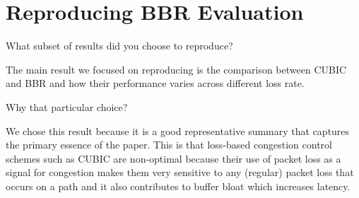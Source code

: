 
\section{Reproducing BBR Evaluation}

 What subset of results did you choose to reproduce?

The main result we focused on reproducing is the comparison between
CUBIC and BBR and how their performance varies across different loss
rate.

 Why that particular choice?

We chose this result because it is a good representative summary
that captures the primary essence of the paper. This is that
loss-based congestion control schemes such as CUBIC are non-optimal
because their use of packet loss as a signal for congestion makes them
very sensitive to any (regular) packet loss that occurs on a path and it
also contributes to buffer bloat which increases latency.



